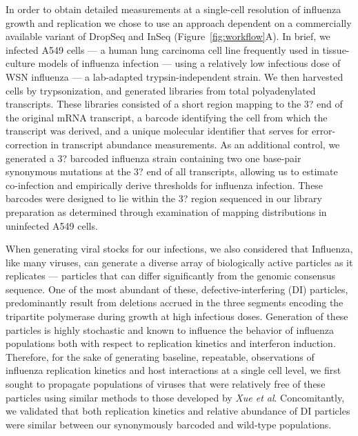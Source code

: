 \documentclass[9pt,lineno]{elife}
\begin{document}
	In order to obtain detailed measurements at a single-cell resolution of influenza growth and replication we chose to use an approach dependent on a commercially available variant of DropSeq and InSeq (Figure~\ref{fig:workflow}A). In brief, we infected A549 cells --- a human lung carcinoma cell line frequently used in tissue-culture models of influenza infection --- using a relatively low infectious dose of WSN influenza --- a lab-adapted trypsin-independent strain. We then harvested cells by trypsonization, and generated libraries from total polyadenylated transcripts. These libraries consisted of a short region mapping to the 3? end of the original mRNA transcript, a barcode identifying the cell from which the transcript was derived, and a unique molecular identifier that serves for error-correction in transcript abundance measurements. As an additional control, we generated a 3? barcoded influenza strain containing two one base-pair synonymous mutations at the 3? end of all transcripts, allowing us to estimate co-infection and empirically derive thresholds for influenza infection. These barcodes were designed to lie within the 3? region sequenced in our library preparation as determined through examination of mapping distributions in uninfected A549 cells.
	
        	When generating viral stocks for our infections, we also considered that Influenza, like many viruses, can generate a diverse array of biologically active particles as it replicates --- particles that can differ significantly from the genomic consensus sequence. One of the most abundant of these, defective-interfering (DI) particles, predominantly result from deletions accrued in the three segments encoding the tripartite polymerase during growth at high infectious doses. Generation of these particles is highly stochastic and known to influence the behavior of influenza populations both with respect to replication kinetics and interferon induction. Therefore, for the sake of generating baseline, repeatable, observations of influenza replication kinetics and host interactions at a single cell level, we first sought to propagate populations of viruses that were relatively free of these particles using similar methods to those developed by \textit{Xue et al}. Concomitantly, we validated that both replication kinetics and relative abundance of DI particles were similar between our synonymously barcoded and wild-type populations. 
	
\end{document}
